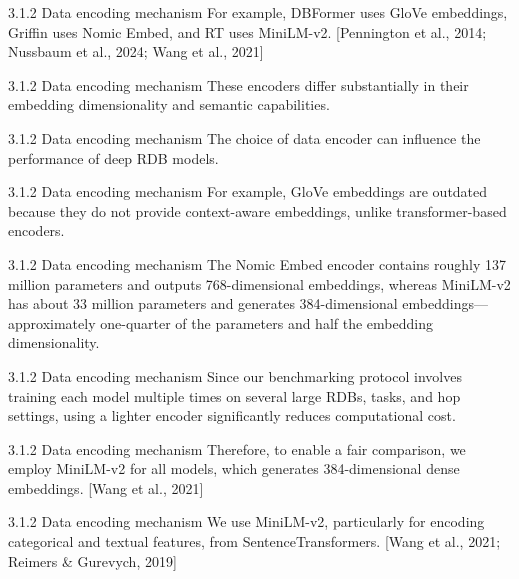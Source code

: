 \documentclass[aspectratio=169,10pt]{beamer}
\newcommand{\cit}[1]{{\scriptsize\color{gray}[#1]}}
\begin{document}
\begin{frame}{3.1.2 Data encoding mechanism}
For example, DBFormer uses GloVe embeddings, Griffin uses Nomic Embed, and RT uses MiniLM-v2.
\cit{Pennington et al., 2014; Nussbaum et al., 2024; Wang et al., 2021}
\end{frame}

\begin{frame}{3.1.2 Data encoding mechanism}
These encoders differ substantially in their embedding dimensionality and semantic capabilities.
\end{frame}

\begin{frame}{3.1.2 Data encoding mechanism}
The choice of data encoder can influence the performance of deep RDB models.
\end{frame}

\begin{frame}{3.1.2 Data encoding mechanism}
For example, GloVe embeddings are outdated because they do not provide context-aware embeddings, unlike transformer-based encoders.
\end{frame}

\begin{frame}{3.1.2 Data encoding mechanism}
The Nomic Embed encoder contains roughly 137 million parameters and outputs 768-dimensional embeddings, whereas MiniLM-v2 has about 33 million parameters and generates 384-dimensional embeddings---approximately one-quarter of the parameters and half the embedding dimensionality.
\end{frame}

\begin{frame}{3.1.2 Data encoding mechanism}
Since our benchmarking protocol involves training each model multiple times on several large RDBs, tasks, and hop settings, using a lighter encoder significantly reduces computational cost.
\end{frame}

\begin{frame}{3.1.2 Data encoding mechanism}
Therefore, to enable a fair comparison, we employ MiniLM-v2 for all models, which generates 384-dimensional dense embeddings.
\cit{Wang et al., 2021}
\end{frame}

\begin{frame}{3.1.2 Data encoding mechanism}
We use MiniLM-v2, particularly for encoding categorical and textual features, from SentenceTransformers.
\cit{Wang et al., 2021; Reimers \& Gurevych, 2019}
\end{frame}
\end{document}
